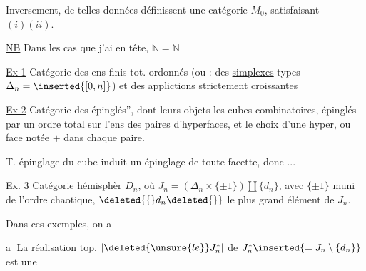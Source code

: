 Inversement, de telles données définissent une catégorie $M_0$, satisfaisant $(i)(ii)$.

\uline{NB} Dans les cas que j'ai en tête, $\mathbb N=\mathbb N$

\uline{Ex 1} Catégorie des ens finis tot. ordonnés (ou : des \uline{simplexes} types $\Delta_n=\inserted{[0,n]}$) et des applictions strictement croissantes

\uline{Ex 2} Catégorie des   épinglés'',  dont leurs objets  les  cubes combinatoires,
  épinglés par un ordre total sur l'ens des paires d'hyperfaces,  et le choix d'une hyper, ou face notée $+$ dans chaque paire.

T. épinglage du cube induit un épinglage de toute facette, donc ... 

\uline{Ex. 3} Catégorie   \uline{hémisphèr} $D_n$, où $J_n=(\Delta_n\times\{\pm1\})\amalg\{d_n\}$, avec $\{\pm1\}$ muni de l'ordre chaotique, $\deleted{\{}d_n\deleted{\}}$ le plus grand élément de $J_n$.

Dans  ces  exemples, on a

\textcircled{a}  La réalisation top. $|\deleted{\unsure{le}} J_n^*|$ de $J_n^*\inserted{=J_n\setminus\{d_n\}}$ est une 

